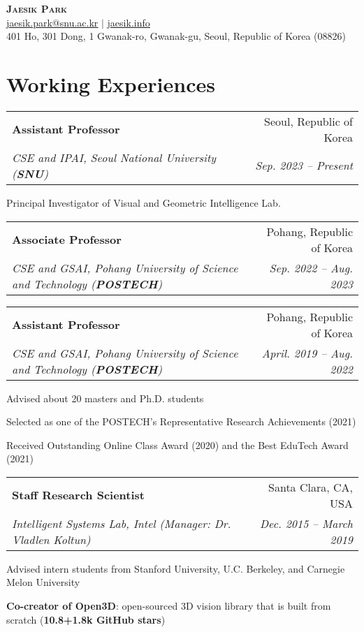 \documentclass[letterpaper,11pt]{article}
\makeatletter
\newcommand{\resumeItem}[1]{
  \small{
  \item{#1 \vspace{-2pt}}
  }
}
\newcommand{\resumeSubheading}[4]{
  \vspace{-2pt}\item
    \begin{tabular*}{0.97\textwidth}[t]{l@{\extracolsep{\fill}}r}
      \textbf{#1} & #2 \\
      \textit{\small#3} & \textit{\small #4} \\
    \end{tabular*}\vspace{-7pt}
}
\newcommand{\resumeSubHeadingListStart}{\begin{itemize}[leftmargin=0.15in, label={}]}
\newcommand{\resumeSubHeadingListEnd}{\end{itemize}}
\newcommand{\resumeItemListStart}{\begin{itemize}}
\newcommand{\resumeItemListEnd}{\end{itemize}\vspace{-5pt}}
\makeatother
\begin{document}
\begin{center}
    \textbf{\Huge \scshape Jaesik Park} \\ \vspace{3pt}
    \small \href{mailto:jaesik.park@snu.ac.kr}{\underline{jaesik.park@snu.ac.kr}} $|$ 
    \href{http://jaesik.info}{\underline{jaesik.info}}\\
    \footnotesize{401 Ho, 301 Dong, 1 Gwanak-ro, Gwanak-gu, Seoul, Republic of Korea (08826)}
\end{center}

\section{Working Experiences}
  \resumeSubHeadingListStart
    \resumeSubheading
      {Assistant Professor}{Seoul, Republic of Korea}
      {CSE and IPAI, Seoul National University \textnormal{(\textbf{SNU})}}{Sep. 2023 -- Present}
      \resumeItemListStart
        \resumeItem{Principal Investigator of Visual and Geometric Intelligence Lab.}
      \resumeItemListEnd
    \resumeSubheading
      {Associate Professor}{Pohang, Republic of Korea}
      {CSE and GSAI, Pohang University of Science and Technology \textnormal{(\textbf{POSTECH})}}{Sep. 2022 -- Aug. 2023}
    \resumeSubheading
      {Assistant Professor}{Pohang, Republic of Korea}
      {CSE and GSAI, Pohang University of Science and Technology \textnormal{(\textbf{POSTECH})}}{April. 2019 -- Aug. 2022}
      \resumeItemListStart
        \resumeItem{Advised about 20 masters and Ph.D. students}
        \resumeItem{Selected as one of the POSTECH's Representative Research Achievements (2021)}
        \resumeItem{Received Outstanding Online Class Award (2020) and the Best EduTech Award (2021)}
      \resumeItemListEnd
    \resumeSubheading
      {Staff Research Scientist}{Santa Clara, CA, USA}
      {Intelligent Systems Lab, Intel (Manager: Dr. Vladlen Koltun)}{Dec. 2015 -- March 2019}
        \resumeItemListStart
          \resumeItem{Advised intern students from Stanford University, U.C. Berkeley, and Carnegie Melon University}
          \resumeItem{\textbf{Co-creator of Open3D}: open-sourced 3D vision library that is built from scratch (\textbf{10.8+1.8k GitHub stars})}
        \resumeItemListEnd
  \resumeSubHeadingListEnd
\end{document}
